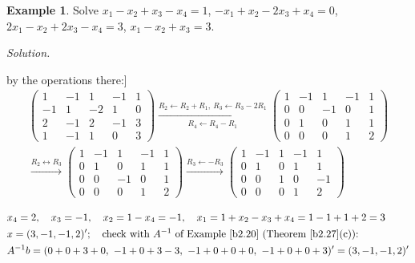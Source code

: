 \documentclass[12pt]{article}
\theoremstyle{definition}
\newtheorem{example}[theorem]{Example}
\newcommand{\boardtop}{\vspace*{-\abovedisplayskip}}
\begin{document}
\begin{example}\label{b2.28}
Solve \(x_1-x_2+x_3-x_4=1\), \(-x_1+x_2-2x_3+x_4=0\), \(2x_1-x_2+2x_3-x_4=3\), \(x_1-x_2+x_3=3\).
\end{example}
\textit{Solution.}
\begin{board}[\(A\) of Example~\ref{b2.20}, \(b=(1,0,3,3)'\); forward elimination of \([A\mid b]\) by the operations
there:]
\[
\begin{gathered}
\left(\begin{array}{cccc|c}1&-1&1&-1&1\\-1&1&-2&1&0\\2&-1&2&-1&3\\1&-1&1&0&3\end{array}\right)
\xrightarrow[R_4\leftarrow R_4-R_1]{R_2\leftarrow R_2+R_1,\ R_3\leftarrow R_3-2R_1}
\left(\begin{array}{cccc|c}1&-1&1&-1&1\\0&0&-1&0&1\\0&1&0&1&1\\0&0&0&1&2\end{array}\right)
\\
\xrightarrow{R_2\leftrightarrow R_3}
\left(\begin{array}{cccc|c}1&-1&1&-1&1\\0&1&0&1&1\\0&0&-1&0&1\\0&0&0&1&2\end{array}\right)
\xrightarrow{R_3\leftarrow-R_3}
\left(\begin{array}{cccc|c}1&-1&1&-1&1\\0&1&0&1&1\\0&0&1&0&-1\\0&0&0&1&2\end{array}\right)
\end{gathered}
\]
\end{board}
\begin{board}
\boardtop
\begin{align*}
&x_4=2,\quad x_3=-1,\quad x_2=1-x_4=-1,\quad x_1=1+x_2-x_3+x_4=1-1+1+2=3\\
&x=(3,-1,-1,2)';\quad\text{check with \(A^{-1}\) of Example~\ref{b2.20} (Theorem~\ref{b2.27}(c)):}\\
&A^{-1}b=(0+0+3+0,\ -1+0+3-3,\ -1+0+0+0,\ -1+0+0+3)'=(3,-1,-1,2)'
\end{align*}
\end{board}
\end{document}
